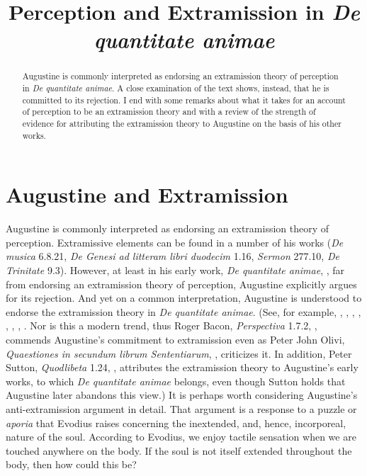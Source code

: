 \documentclass[12pt]{article}
\title{Perception and Extramission in \emph{De quantitate animae}}
\date{} %
\begin{document}
\maketitle
\begin{abstract}
	\noindent Augustine is commonly interpreted as endorsing an extramission theory of perception in \emph{De quantitate animae}. A close examination of the text shows, instead, that he is committed to its rejection. I end with some remarks about what it takes for an account of perception to be an extramission theory and with a review of the strength of evidence for attributing the extramission theory to Augustine on the basis of his other works.
\end{abstract}

\setlength{\parindent}{1em}


\section{Augustine and Extramission} %
\label{sec:augustine_and_extramission}

Augustine is commonly interpreted as endorsing an extramission theory of perception. Extramissive elements can be found in a number of his works (\emph{De musica} 6.8.21, \emph{De Genesi ad litteram libri duodecim} 1.16, \emph{Sermon} 277.10, \emph{De Trinitate} 9.3). However, at least in his early work, \emph{De quantitate animae}, \citealt{Migne:1845aa}, far from endorsing an extramission theory of perception, Augustine explicitly argues for its rejection. And yet on a common interpretation, Augustine is understood to endorse the extramission theory in \emph{De quantitate animae}. (See, for example, \citealt[205 n55, 208-10 n73]{Colleran:1949ys}, \citealt[169 n56]{Gannon:1956aa}, \citealt[82--3]{ODaly:1987fq}, \citealt[276 n64]{Brittain:2002hl}, \citealt[248 n8]{Silva:2010zh}, \citealt[223--4]{Brown:2012aa}, \citealt{Silva:2014bh}, \citealt[154, 266]{Smith:2015aa}. Nor is this a modern trend, thus Roger Bacon, \emph{Perspectiva} 1.7.2, \citealt[100]{Lindberg:1996bk}, commends Augustine's commitment to extramission even as Peter John Olivi, \emph{Quaestiones in secundum librum Sententiarum}, \citealt[ 58, 482--484]{Jansen:1922aa}, criticizes it. In addition, Peter Sutton, \emph{Quodlibeta} 1.24, \citealt[111]{Etzkorn:1963aa}, attributes the extramission theory to Augustine's early works, to which \emph{De quantitate animae} belongs, even though Sutton holds that Augustine later abandons this view.) It is perhaps worth considering Augustine's anti-extramission argument in detail. That argument is a response to a puzzle or \emph{aporia} that Evodius raises concerning the inextended, and, hence, incorporeal, nature of the soul. According to Evodius, we enjoy tactile sensation when we are touched anywhere on the body. If the soul is not itself extended throughout the body, then how could this be?  
\end{document}
